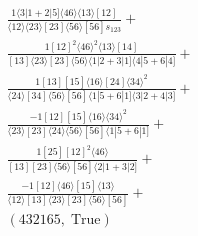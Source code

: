 \documentclass[varwidth, border=5pt]{standalone}
\begin{document}
\begin{my}
$\begin{gathered}
\scriptscriptstyle\frac{1⟨3|1+2|5]⟨46⟩⟨13⟩[12]}{⟨12⟩⟨23⟩[23]⟨56⟩[56]s_{123}}+\\
\scriptscriptstyle\frac{1[12]^2⟨46⟩^2⟨13⟩[14]}{[13]⟨23⟩[23]⟨56⟩⟨1|2+3|1]⟨4|5+6|4]}+\\
\scriptscriptstyle\frac{1[13][15]⟨16⟩[24]⟨34⟩^2}{⟨24⟩[34]⟨56⟩[56]⟨1|5+6|1]⟨3|2+4|3]}+\\
\scriptscriptstyle\frac{-1[12][15]⟨16⟩⟨34⟩^2}{⟨23⟩[23]⟨24⟩⟨56⟩[56]⟨1|5+6|1]}+\\
\scriptscriptstyle\frac{1[25][12]^2⟨46⟩}{[13][23]⟨56⟩[56]⟨2|1+3|2]}+\\
\scriptscriptstyle\frac{-1[12]⟨46⟩[15]⟨13⟩}{⟨12⟩[13]⟨23⟩[23]⟨56⟩[56]}+\\
\scriptscriptstyle(432165,\;\text{True})\phantom{+}
\end{gathered}$
\end{my}
\end{document}
